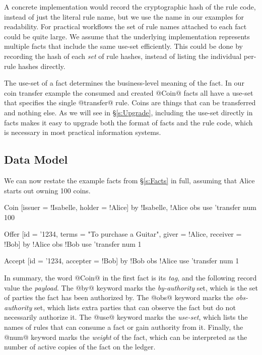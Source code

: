 A concrete implementation would record the cryptographic hash of the rule code, instead of just the literal rule name, but we use the name in our examples for readability. For practical workflows the set of rule names attached to each fact could be quite large. We assume that the underlying implementation represents multiple facts that include the same use-set efficiently. This could be done by recording the hash of each \emph{set} of rule hashes, instead of listing the individual per-rule hashes directly.

\eject{}
The use-set of a fact determines the business-level meaning of the fact. In our coin transfer example the consumed and created @Coin@ facts all have a use-set that specifies the single @transfer@ rule. Coins are things that can be transferred and nothing else. As we will see in \S\ref{s:Upgrade}, including the use-set directly in facts makes it easy to upgrade both the format of facts and the rule code, which is necessary in most practical information systems.


\subsection{Data Model}
\label{s:NowWithMetadata}
\label{s:DataModel}
We can now restate the example facts from \S\ref{s:Facts} in full, assuming that Alice starts out owning 100 coins.
\begin{small}
\begin{code}
 Coin   [issuer = !Isabelle, holder  = !Alice]
    by  {!Isabelle, !Alice}  obs {}
    use {'transfer}          num 100

 Offer  [id = '1234, terms = "To purchase a Guitar",
         giver = !Alice, receiver = !Bob]
    by  {!Alice}             obs {!Bob}
    use {'transfer}          num 1

 Accept [id = '1234, accepter = !Bob]
    by  {!Bob}               obs {!Alice}
    use {'transfer}          num 1
\end{code}
\end{small}
In summary, the word @Coin@ in the first fact is its \emph{tag}, and the following record value the \emph{payload}. The @by@ keyword marks the \emph{by-authority} set, which is the set of parties the fact has been authorized by. The @obs@ keyword marks the \emph{obs-authority} set, which lists extra parties that can observe the fact but do not necessarily authorize it. The @use@ keyword marks the \emph{use-set}, which lists the names of rules that can consume a fact or gain authority from it. Finally, the @num@ keyword marks the \emph{weight} of the fact, which can be interpreted as the number of active copies of the fact on the ledger.

